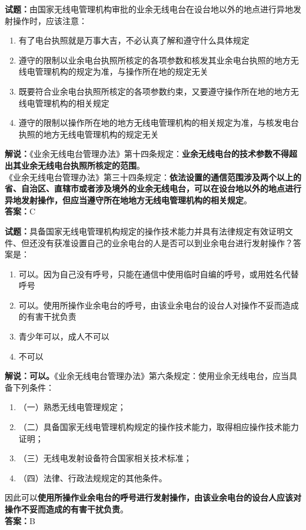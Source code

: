 \documentclass{ctexbook}
\begin{document}
\noindent\textbf{试题：}由国家无线电管理机构审批的业余无线电台在设台地以外的地点进行异地发射操作时，应该注意：
\begin{enumerate}[leftmargin=3em]
	\item 有了电台执照就是万事大吉，不必认真了解和遵守什么具体规定
	\item 遵守的限制以业余电台执照所核定的各项参数和核发其业余电台执照的地方无线电管理机构的规定为准，与操作所在地的规定无关
	\item 既要符合业余电台执照所核定的各项参数约束，又要遵守操作所在地的地方无线电管理机构的相关规定
	\item 遵守的限制以操作所在地的地方无线电管理机构的相关规定为准，与核发电台执照的地方无线电管理机构的规定无关
\end{enumerate}
\noindent\textbf{解说：}《业余无线电台管理办法》第十四条规定：\textbf{业余无线电台的技术参数不得超出其业余无线电台执照所核定的范围}。\\
《业余无线电台管理办法》第三十四条规定：\textbf{依法设置的通信范围涉及两个以上的省、自治区、直辖市或者涉及境外的业余无线电台，可以在设台地以外的地点进行异地发射操作，但应当遵守所在地地方无线电管理机构的相关规定}。\\\noindent\textbf{答案：}C




\bigskip


\noindent\textbf{试题：}具备国家无线电管理机构规定的操作技术能力并具有法律规定有效证明文件、但还没有获准设置自己的业余电台的人是否可以到业余电台进行发射操作？答案是：
\begin{enumerate}[leftmargin=3em]
	\item 可以。因为自己没有呼号，只能在通信中使用临时自编的呼号，或用姓名代替呼号
	\item 可以。使用所操作业余电台的呼号，由该业余电台的设台人对操作不妥而造成的有害干扰负责
	\item 青少年可以，成人不可以
	\item 不可以
\end{enumerate}
\noindent\textbf{解说：可以。}《业余无线电台管理办法》第六条规定：使用业余无线电台，应当具备下列条件：
\begin{enumerate}[label=, leftmargin=1em]
	\item （一）熟悉无线电管理规定；
	\item （二）具备国家无线电管理机构规定的操作技术能力，取得相应操作技术能力证明；
	\item （三）无线电发射设备符合国家相关技术标准；
	\item （四）法律、行政法规规定的其他条件。
\end{enumerate}
因此可以\textbf{使用所操作业余电台的呼号进行发射操作，由该业余电台的设台人应该对操作不妥而造成的有害干扰负责}。\\\noindent\textbf{答案：}B
\end{document}
